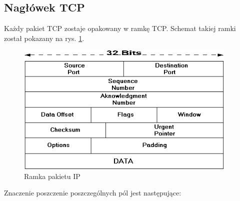 \documentclass[a4paper,12pt,oneside]{book}
\begin{document}
		\subsection{Nagłówek TCP}
			Każdy pakiet TCP zostaje opakowany w ramkę TCP.
			Schemat takiej ramki został pokazany na rys. \ref{fig:ramka_tcp}.
			\begin{figure}[h]
				\centering
				\includegraphics[width=400px]{tcp.png}
				\caption{Ramka pakietu IP}
				\label{fig:ramka_tcp}
			\end{figure}
			Znaczenie poszczenie poszczególnych pól jest następujące:
\end{document}
